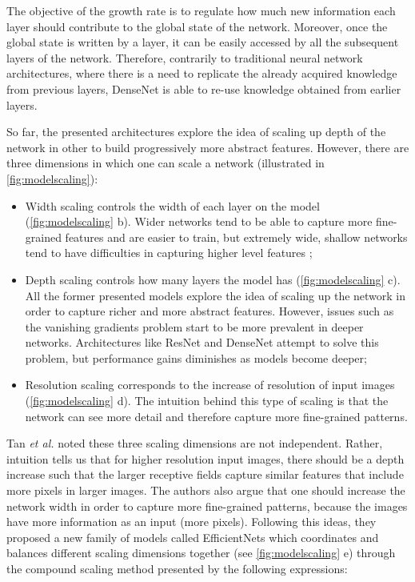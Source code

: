     The objective of the growth rate is to regulate how much new information each layer should contribute to the global state of the network. Moreover, once the global state is written by a layer, it can be easily accessed by all the subsequent layers of the network. Therefore, contrarily to traditional neural network architectures, where there is a need to replicate the already acquired knowledge from previous layers, DenseNet is able to re-use knowledge obtained from earlier layers. \par
    
    So far, the presented architectures explore the idea of scaling up depth of the network in other to build progressively more abstract features. However, there are three dimensions in which one can scale a network (illustrated in \autoref{fig:modelscaling}): 
    \begin{itemize}
        \item Width scaling controls the width of each layer on the model (\autoref{fig:modelscaling} b). Wider networks tend to be able to capture more fine-grained features and are easier to train, but extremely wide, shallow networks tend to have difficulties in capturing higher level features \cite{efficientnet};
        \item Depth scaling controls how many layers the model has (\autoref{fig:modelscaling} c). All the former presented models explore the idea of scaling up the network in order to capture richer and more abstract features. However, issues such as the vanishing gradients problem start to be more prevalent in deeper networks. Architectures like ResNet \cite{resnet} and DenseNet \cite{densenet} attempt to solve this problem, but performance gains diminishes as models become deeper;
        \item Resolution scaling corresponds to the increase of resolution of input images (\autoref{fig:modelscaling} d). The intuition behind this type of scaling is that the network can see more detail and therefore capture more fine-grained patterns. 
    \end{itemize}
    Tan \textit{et al.} noted these three scaling dimensions are not independent. Rather, intuition tells us that for higher resolution input images, there should be a depth increase such that the larger receptive fields capture similar features that include more pixels in larger images. The authors also argue that one should increase the network width in order to capture more fine-grained patterns, because the images have more information as an input (more pixels). Following this ideas, they proposed a new family of models called EfficientNets \cite{efficientnet} which coordinates and balances different scaling dimensions together (see \autoref{fig:modelscaling} e) through the compound scaling method presented by the following expressions: \par
